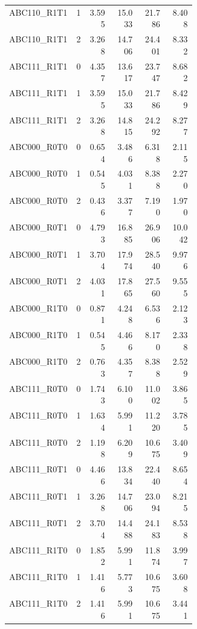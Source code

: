 \begin{longtable}{@{}p{0.36\linewidth}rrrrr@{}}
ABC110\_\allowbreak{}R1T1 & 1 & 3.595 & 15.033 & 21.786 & 8.408 \\
ABC110\_\allowbreak{}R1T1 & 2 & 3.268 & 14.706 & 24.401 & 8.332 \\
ABC111\_\allowbreak{}R1T1 & 0 & 4.357 & 13.617 & 23.747 & 8.682 \\
ABC111\_\allowbreak{}R1T1 & 1 & 3.595 & 15.033 & 21.786 & 8.429 \\
ABC111\_\allowbreak{}R1T1 & 2 & 3.268 & 14.815 & 24.292 & 8.277 \\
ABC000\_\allowbreak{}R0T0 & 0 & 0.654 & 3.486 & 6.318 & 2.115 \\
ABC000\_\allowbreak{}R0T0 & 1 & 0.545 & 4.031 & 8.388 & 2.270 \\
ABC000\_\allowbreak{}R0T0 & 2 & 0.436 & 3.377 & 7.190 & 1.970 \\
ABC000\_\allowbreak{}R0T1 & 0 & 4.793 & 16.885 & 26.906 & 10.042 \\
ABC000\_\allowbreak{}R0T1 & 1 & 3.704 & 17.974 & 28.540 & 9.976 \\
ABC000\_\allowbreak{}R0T1 & 2 & 4.031 & 17.865 & 27.560 & 9.555 \\
ABC000\_\allowbreak{}R1T0 & 0 & 0.871 & 4.248 & 6.536 & 2.123 \\
ABC000\_\allowbreak{}R1T0 & 1 & 0.545 & 4.466 & 8.170 & 2.338 \\
ABC000\_\allowbreak{}R1T0 & 2 & 0.763 & 4.357 & 8.388 & 2.529 \\
ABC111\_\allowbreak{}R0T0 & 0 & 1.743 & 6.100 & 11.002 & 3.865 \\
ABC111\_\allowbreak{}R0T0 & 1 & 1.634 & 5.991 & 11.220 & 3.785 \\
ABC111\_\allowbreak{}R0T0 & 2 & 1.198 & 6.209 & 10.675 & 3.409 \\
ABC111\_\allowbreak{}R0T1 & 0 & 4.466 & 13.834 & 22.440 & 8.654 \\
ABC111\_\allowbreak{}R0T1 & 1 & 3.268 & 14.706 & 23.094 & 8.215 \\
ABC111\_\allowbreak{}R0T1 & 2 & 3.704 & 14.488 & 24.183 & 8.538 \\
ABC111\_\allowbreak{}R1T0 & 0 & 1.852 & 5.991 & 11.874 & 3.997 \\
ABC111\_\allowbreak{}R1T0 & 1 & 1.416 & 5.773 & 10.675 & 3.608 \\
ABC111\_\allowbreak{}R1T0 & 2 & 1.416 & 5.991 & 10.675 & 3.441 \\
\end{longtable}
\endgroup
